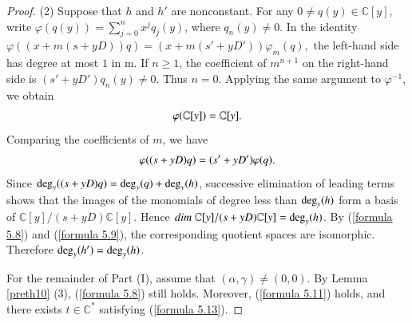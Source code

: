 \documentclass[12pt,reqno]{amsart}
\def\deg{{\rm deg}}
\def\C{\mathbb{C}}
\numberwithin{equation}{section}
\begin{document}
\begin{proof}
  
\rm(2) Suppose that $h$ and $h'$ are nonconstant. For any $0\neq q(y)\in\mathbb C[y]$, write $\varphi(q(y))=\sum_{j=0}^{n}x^jq_j(y)$, where $q_n(y)\ne0$. In the identity $\varphi\left(\left(x+m(s+yD)\right)q\right) =\left(x+m(s'+yD')\right)\varphi_m(q),$ the left-hand side has degree at most $1$ in m. If $n\ge1$, the coefficient of $m^{n+1}$ on the right-hand side is $(s'+yD')q_n(y)\ne0$. Thus $n=0$. Applying the same argument to $\varphi^{-1}$, we obtain
 \begin{equation}\label{formula 5.8}
\aligned
 \varphi(\mathbb C[y])=\mathbb C[y].
\endaligned
\end{equation}
 Comparing the coefficients of $m$, we have 
 \begin{equation}\label{formula 5.9}
\aligned
 \varphi((s+yD)q)=(s'+yD')\varphi(q). 
\endaligned
\end{equation}
Since $\deg_y((s+yD)q)=\deg_y(q)+\deg_y (h)$, successive elimination of leading terms shows that the images of the monomials of degree less than ${\rm deg}_y (h)$ form a basis of $\mathbb C[y] / (s+yD)\mathbb C[y]$. Hence
   $dim\ \mathbb C[y] / (s+yD)\mathbb C[y]=\deg_y(h)$.
By (\ref{formula 5.8}) and (\ref{formula 5.9}), the corresponding quotient spaces are isomorphic.
Therefore $\deg_y (h')=\deg_y (h)$.






For the remainder of Part ($\mathrm{I}$), assume that $(\alpha,\gamma)\ne(0,0)$. By Lemma \ref{preth10} (3), (\ref{formula 5.8}) still holds. Moreover, (\ref{formula 5.11}) holds, and there exists $t\in\C^*$ satisfying (\ref{formula 5.13}).


\end{proof}
\end{document}
